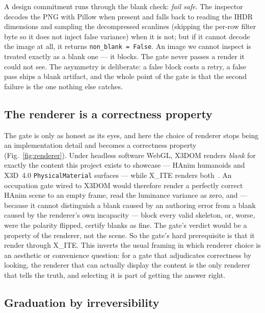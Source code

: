 \documentclass[sigconf,nonacm,screen,anonymous]{acmart}
\begin{document}
A design commitment runs through the blank check: \emph{fail safe}. The inspector decodes the PNG with Pillow when present and falls back to reading the IHDR dimensions and sampling the decompressed scanlines (skipping the per-row filter byte so it does not inject false variance) when it is not; but if it cannot decode the image at all, it returns \texttt{non\_blank = False}. An image we cannot inspect is treated exactly as a blank one --- it blocks. The gate never passes a render it could not see. The asymmetry is deliberate: a false block costs a retry, a false pass ships a blank artifact, and the whole point of the gate is that the second failure is the one nothing else catches.

\subsection{The renderer is a correctness property}

The gate is only as honest as its eyes, and here the choice of renderer stops being an implementation detail and becomes a correctness property (Fig.~\ref{fig:renderer}). Under headless software WebGL, X3DOM renders \emph{blank} for exactly the content this project exists to showcase --- HAnim humanoids and X3D~4.0 \texttt{PhysicalMaterial} surfaces --- while X\_ITE renders both~\cite{xite,x3dom,gltf,playwright}. An occupation gate wired to X3DOM would therefore render a perfectly correct HAnim scene to an empty frame, read the luminance variance as zero, and --- because it cannot distinguish a blank caused by an authoring error from a blank caused by the renderer's own incapacity --- block every valid skeleton, or, worse, were the polarity flipped, certify blanks as fine. The gate's verdict would be a property of the renderer, not the scene. So the gate's hard prerequisite is that it render through X\_ITE. This inverts the usual framing in which renderer choice is an aesthetic or convenience question: for a gate that adjudicates correctness by looking, the renderer that can actually display the content is the only renderer that tells the truth, and selecting it is part of getting the answer right.

\subsection{Graduation by irreversibility}
\end{document}
